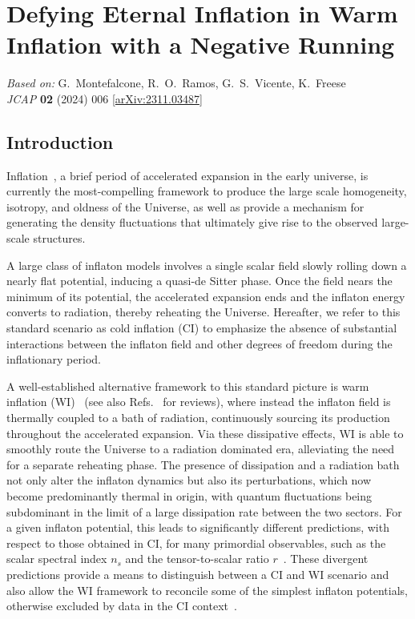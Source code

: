 \chapter{Defying Eternal Inflation in Warm Inflation with a Negative Running}
\label{ch:wi-eternal}

\begin{center}
\textit{Based on:} G.~Montefalcone, R.~O.~Ramos, G.~S.~Vicente, K.~Freese\\
\textit{JCAP} \textbf{02} (2024) 006
[\href{https://arxiv.org/abs/2311.03487}{arXiv:2311.03487}]
\end{center}
\vspace{1em}


\section{Introduction}
\label{sec:ch5-intro}
Inflation~\cite{Guth:1980zm, Linde:1981mu, Albrecht:1982wi, Kazanas:1980tx, Starobinsky:1980te, Sato:1980yn, Mukhanov:1981xt, Linde:1983gd, Mukhanov:1990me}, a brief period of accelerated expansion in the early universe, is currently the most-compelling framework to produce the large scale homogeneity, isotropy, and oldness of the Universe, as well as provide a mechanism for generating the density fluctuations that ultimately give rise to the observed large-scale
structures.

A large class of inflaton models involves a single scalar field slowly rolling down a nearly
flat potential, inducing a quasi-de Sitter phase. Once the field nears the minimum of its potential, the accelerated expansion ends and the inflaton energy converts to
radiation, thereby reheating the Universe.
Hereafter, we refer to this standard scenario as cold inflation (CI) to emphasize the absence of substantial interactions between the inflaton field and other degrees of freedom during the inflationary period.

A well-established alternative framework to this standard picture is warm inflation (WI)~\cite{Berera:1995ie} (see
also Refs.~\cite{Berera:2008ar,Bastero-Gil:2009sdq,Kamali:2023lzq} for
reviews), where instead the inflaton field  is thermally coupled to a bath of radiation, continuously sourcing its production throughout the accelerated expansion.
Via these
dissipative effects, WI is able to smoothly route the Universe to
a radiation dominated era, alleviating the need for a separate
reheating phase.
The presence of dissipation and a radiation bath not only alter the inflaton dynamics but also its perturbations, which now become predominantly thermal in origin, with quantum fluctuations being subdominant in the limit of a
large dissipation rate between the two sectors. For a given inflaton
potential, this leads to significantly different predictions, with respect to those obtained in CI, for many
primordial observables, such as the scalar spectral index $n_s$ and
the tensor-to-scalar ratio $r$~\cite{Bartrum:2013fia,Bastero-Gil:2014raa,Bastero-Gil:2016qru,Bastero-Gil:2019gao}. These divergent predictions provide a means to distinguish between a CI and WI scenario and also allow the WI framework to reconcile some of the simplest inflaton potentials, otherwise excluded by data in the CI context~\cite{Benetti:2016jhf}.

